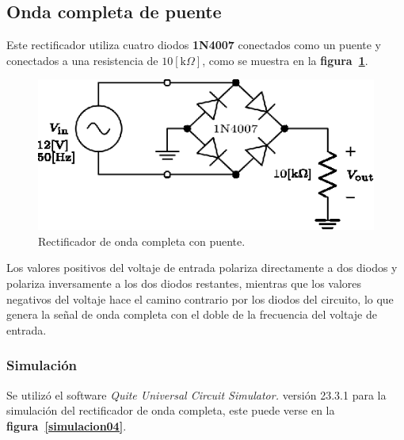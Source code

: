 \subsection{Onda completa de puente}
Este rectificador utiliza cuatro diodos \textbf{1N4007} conectados como un
puente y conectados a una resistencia de $10[\text{k}\Omega]$, como se muestra
en la \textbf{figura~\ref{circuito04}}.

\begin{figure}[!h]
\centering
\includegraphics[scale=1.1]{diagramas/04.onda_completa1.eps}
\caption{Rectificador de onda completa con puente.}
\label{circuito04}
\end{figure}

Los valores positivos del voltaje de entrada polariza directamente a dos diodos
y polariza inversamente a los dos diodos restantes, mientras que los valores
negativos del voltaje hace el camino contrario por los diodos del circuito, lo
que genera la señal de onda completa con el doble de la frecuencia del voltaje
de entrada.

\subsubsection{Simulación}
Se utilizó el software \emph{Quite Universal Circuit Simulator.} versión 23.3.1
para la simulación del rectificador de onda completa, este puede verse en la
\textbf{figura~\ref{simulacion04}}.

